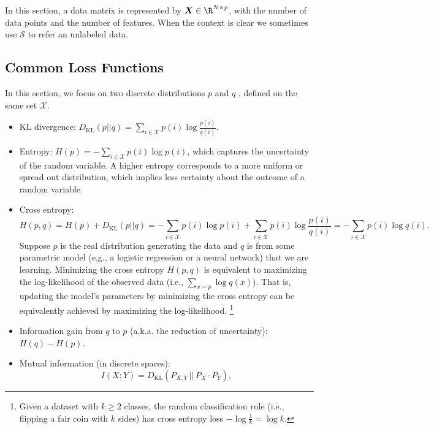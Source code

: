 

In this section, a data matrix is represented by $\bm{X} \in \R^{\ndata \times \nfeat}$, with \ndata the number of data points and \nfeat the number of features. 
When the context is clear we sometimes use $\mathcal{S}$ to refer an unlabeled data. 

\subsection{Common Loss Functions}
In this section, we focus on two discrete distributions $p$ and $q$ , defined on the same set $\mathcal{X}$.
    \begin{itemize}
        \item KL divergence: $D_\text{KL}(p || q) = \sum_{i \in \mathcal{X}}^{}{p(i) \log \frac{p(i)}{q(i)}}$.
        \item Entropy:  $H(p) = -\sum_{i \in \mathcal{X}}^{}{p(i) \log p(i)}$, which captures the uncertainty of the random variable. 
            A higher entropy corresponds to a more uniform or spread out distribution, which implies less certainty about the outcome of a random variable.
        \item Cross entropy:
            \begin{equation*}
               H(p, q) = H(p) + D_\text{KL}(p || q) =  -\sum_{i \in \mathcal{X}}^{}{p(i) \log p(i)} + \sum_{i \in \mathcal{X}}^{}{p(i) \log \frac{p(i)}{q(i)}} =  -\sum_{i \in \mathcal{X}}^{}{p(i) \log q(i)}.
            \end{equation*}
        Suppose $p$ is the real distribution generating the data and $q$ is from some parametric model (e,g., a logistic regression or a neural network) that we are learning.
        Minimizing the cross entropy $H(p, q)$ is equivalent to maximizing the log-likelihood of the observed data (i.e., $\sum_{x \sim p}^{}{\log q(x)}$). That is, updating the model's parameters by minimizing the cross entropy can be equivalently achieved by maximizing the log-likelihood.
        \footnote{Given a dataset with $k \ge 2$ classes, the random classification rule (i.e., flipping a fair coin with $k$ sides) has cross entropy loss $-\log{\frac{1}{k}} = \log{k}$.}
        \item Information gain from $q$ to $p$ (a.k.a. the reduction of uncertainty): $H(q) - H(p)$.
        \item Mutual information (in discrete spaces): 
            \begin{equation*}
                I(X; Y) = D_\text{KL}\left( P_{X, Y} \, || \, P_X \cdot P_Y \right),

\end{equation*}
\end{itemize}

